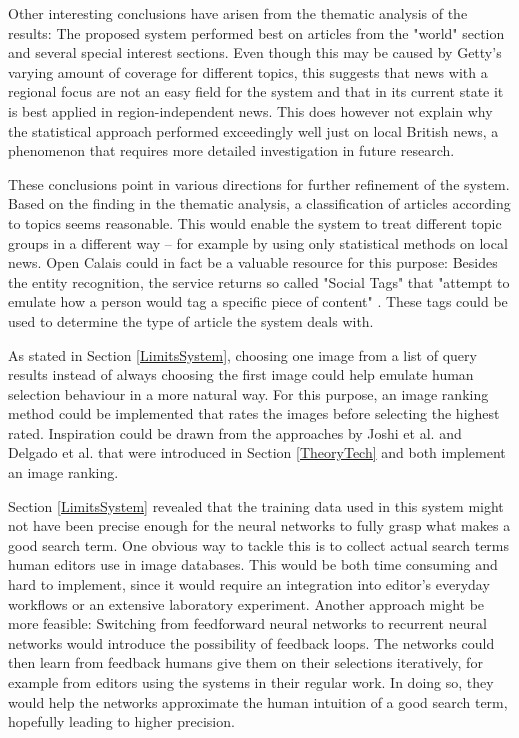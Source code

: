 \documentclass[11pt,a4paper,twoside]{article}
\begin{document}
Other interesting conclusions have arisen from the thematic analysis of the results: The proposed system performed best on articles from the "world" section and several special interest sections. Even though this may be caused by Getty's varying amount of coverage for different topics, this suggests that news with a regional focus are not an easy field for the system and that in its current state it is best applied in region-independent news. This does however not explain why the statistical approach performed exceedingly well just on local British news, a phenomenon that requires more detailed investigation in future research.

\bigskip

These conclusions point in various directions for further refinement of the system. Based on the finding in the thematic analysis, a classification of articles according to topics seems reasonable. This would enable the system to treat different topic groups in a different way -- for example by using only statistical methods on local news. Open Calais could in fact be a valuable resource for this purpose: Besides the entity recognition, the service returns so called "Social Tags" that "attempt to emulate how a person would tag a specific piece of content" \cite[p. 11]{ThomsonReuters2018ThomsonGuide}. These tags could be used to determine the type of article the system deals with.

As stated in Section \ref{LimitsSystem}, choosing one image from a list of query results instead of always choosing the first image could help emulate human selection behaviour in a more natural way. For this purpose, an image ranking method could be implemented that rates the images before selecting the highest rated. Inspiration could be drawn from the approaches by Joshi et al. \cite{Joshi2006TheIllustration} and Delgado et al. \cite{Delgado2010AutomatedExperience} that were introduced in Section \ref{TheoryTech} and both implement an image ranking.

Section \ref{LimitsSystem} revealed that the training data used in this system might not have been precise enough for the neural networks to fully grasp what makes a good search term. One obvious way to tackle this is to collect actual search terms human editors use in image databases. This would be both time consuming and hard to implement, since it would require an integration into editor's everyday workflows or an extensive laboratory experiment. Another approach might be more feasible: Switching from feedforward neural networks to recurrent neural networks would introduce the possibility of feedback loops. The networks could then learn from feedback humans give them on their selections iteratively, for example from editors using the systems in their regular work. In doing so, they would help the networks approximate the human intuition of a good search term, hopefully leading to higher precision.
\end{document}
